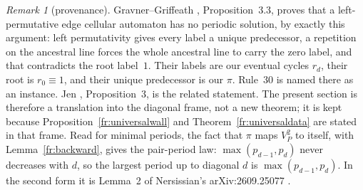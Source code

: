\documentclass[11pt]{article}
\theoremstyle{definition}
\theoremstyle{remark}
\newtheorem{remark}[theorem]{Remark}
\begin{document}
\begin{remark}[provenance]
Gravner--Griffeath \cite{GG}, Proposition~3.3, proves that a left-permutative edge cellular automaton
has no periodic solution, by exactly this argument: left permutativity gives every label a unique
predecessor, a repetition on the ancestral line forces the whole ancestral line to carry the zero label,
and that contradicts the root label~$1$. Their labels are our eventual cycles $r_d$, their root is
$r_0\equiv1$, and their unique predecessor is our $\pi$. Rule~30 is named there as an instance. Jen
\cite{Jen90}, Proposition~3, is the related statement. The present section is therefore a translation
into the diagonal frame, not a new theorem; it is kept because Proposition~\ref{fr:universalwall}
and Theorem~\ref{fr:universaldata} are stated in that frame. Read for minimal periods, the fact that $\pi$ maps $V_P^2$ to itself, with Lemma~\ref{fr:backward}, gives the pair-period law: $\max(p_{d-1},p_d)$ never decreases with $d$, so the largest period up to diagonal $d$ is $\max(p_{d-1},p_d)$. In the second form it is Lemma~2 of Nersissian's arXiv:2609.25077 \cite{Nersissian}.
\end{remark}
\end{document}
